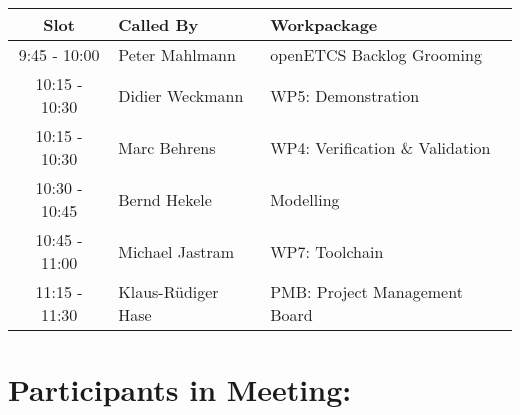 \documentclass[a4paper, 11pt]{article}
\begin{document}
\begin{tabular}{|c|l|l|}
\hline
\textbf{Slot} &  \textbf{Called By} & \textbf{Workpackage} \\
\hline  
9:45 - 10:00 & Peter Mahlmann & openETCS Backlog Grooming  \\\hline
10:15 - 10:30 & Didier Weckmann & WP5: Demonstration \\\hline
10:15 - 10:30 & Marc Behrens & WP4: Verification \& Validation \\\hline 
10:30 - 10:45 & Bernd Hekele & Modelling \\\hline
10:45 - 11:00 & Michael Jastram  & WP7: Toolchain \\\hline
11:15 - 11:30 & Klaus-R\"udiger Hase & PMB: Project Management Board \\\hline  
\end{tabular}

\section{Participants in Meeting:}
\end{document}
